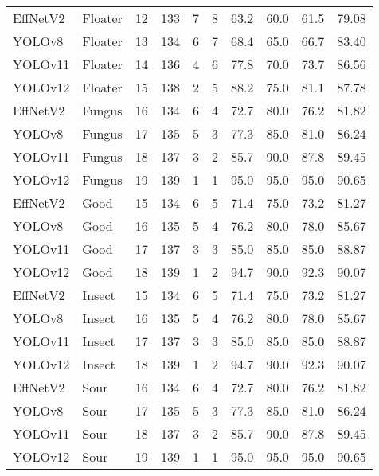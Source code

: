 \begin{center}
\begin{longtable}{@{}>{\raggedright}p{1.8cm}>{\raggedright}p{1.2cm}cccccccc@{}}
	EffNetV2      		& Floater      & 12 & 133 & 7 & 8 & 63.2 & 60.0 & 61.5 & 79.08 \\
	YOLOv8               & Floater      & 13 & 134 & 6 & 7 & 68.4 & 65.0 & 66.7 & 83.40 \\
	YOLOv11              & Floater      & 14 & 136 & 4 & 6 & 77.8 & 70.0 & 73.7 & 86.56 \\
	YOLOv12              & Floater      & 15 & 138 & 2 & 5 & 88.2 & 75.0 & 81.1 & 87.78 \\
	\addlinespace
	
	EffNetV2      & Fungus       & 16 & 134 & 6 & 4 & 72.7 & 80.0 & 76.2 & 81.82 \\
	YOLOv8               & Fungus       & 17 & 135 & 5 & 3 & 77.3 & 85.0 & 81.0 & 86.24 \\
	YOLOv11              & Fungus       & 18 & 137 & 3 & 2 & 85.7 & 90.0 & 87.8 & 89.45 \\
	YOLOv12              & Fungus       & 19 & 139 & 1 & 1 & 95.0 & 95.0 & 95.0 & 90.65 \\
	\addlinespace
	
	EffNetV2      		& Good         & 15 & 134 & 6 & 5 & 71.4 & 75.0 & 73.2 & 81.27 \\
	YOLOv8               & Good         & 16 & 135 & 5 & 4 & 76.2 & 80.0 & 78.0 & 85.67 \\
	YOLOv11              & Good         & 17 & 137 & 3 & 3 & 85.0 & 85.0 & 85.0 & 88.87 \\
	YOLOv12              & Good         & 18 & 139 & 1 & 2 & 94.7 & 90.0 & 92.3 & 90.07 \\
	\addlinespace
	
	EffNetV2      		& Insect       & 15 & 134 & 6 & 5 & 71.4 & 75.0 & 73.2 & 81.27 \\
	YOLOv8               & Insect       & 16 & 135 & 5 & 4 & 76.2 & 80.0 & 78.0 & 85.67 \\
	YOLOv11              & Insect       & 17 & 137 & 3 & 3 & 85.0 & 85.0 & 85.0 & 88.87 \\
	YOLOv12              & Insect       & 18 & 139 & 1 & 2 & 94.7 & 90.0 & 92.3 & 90.07 \\
	\addlinespace
	
	EffNetV2      		& Sour         & 16 & 134 & 6 & 4 & 72.7 & 80.0 & 76.2 & 81.82 \\
	YOLOv8               & Sour         & 17 & 135 & 5 & 3 & 77.3 & 85.0 & 81.0 & 86.24 \\
	YOLOv11              & Sour         & 18 & 137 & 3 & 2 & 85.7 & 90.0 & 87.8 & 89.45 \\
	YOLOv12              & Sour         & 19 & 139 & 1 & 1 & 95.0 & 95.0 & 95.0 & 90.65 \\
	\end{longtable}
\end{center}

